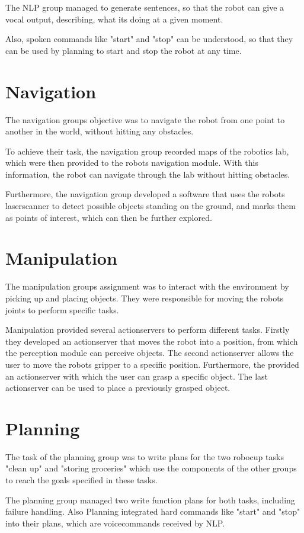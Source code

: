 \documentclass[main.tex]{subfiles}
\begin{document}
		The NLP group managed to generate sentences, so that the robot can give a vocal output, describing, what its doing at a given moment.
		
		Also, spoken commands like "start" and "stop" can be understood, so that they can be used by planning to start and stop the robot at any time.
		
		\section{Navigation}	  	
		The navigation groups objective was to navigate the robot from one point to another in the world, without hitting any obstacles.
		
		To achieve their task, the navigation group recorded maps of the robotics lab, which were then provided to the robots navigation module. With this information, the robot can navigate through the lab without hitting obstacles.
		
		Furthermore, the navigation group developed a software that uses the robots laserscanner to detect possible objects standing on the ground, and marks them as points of interest, which can then be further explored.

		\section{Manipulation}
		The manipulation groups assignment was to interact with the environment by picking up and placing objects. They were responsible for moving the robots joints to perform specific tasks.
		
		Manipulation provided several actionservers to perform different tasks. Firstly they developed an actionserver that moves the robot into a position, from which the perception module can perceive objects. The second actionserver allows the user to move the robots gripper to a specific position. Furthermore, the provided an actionserver with which the user can grasp a specific object. The last actionserver can be used to place a previously grasped object.
		
		\section{Planning}
		The task of the planning group was to write plans for the two robocup tasks "clean up" and "storing groceries" which use the components of the other groups to reach the goals specified in these tasks.
		
		The planning group managed two write function plans for both tasks, including failure handling. Also Planning integrated hard commands like "start" and "stop" into their plans, which are voicecommands received by NLP.
	\endgroup
\end{document}
